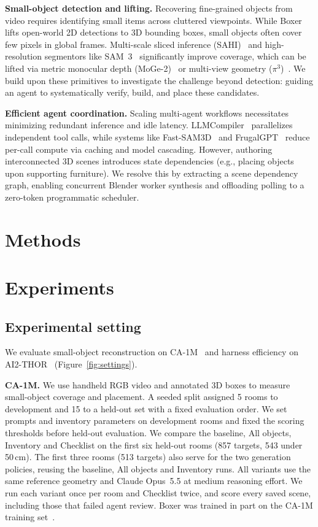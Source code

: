 \documentclass{article}
\begin{document}
\textbf{Small-object detection and lifting.}
Recovering fine-grained objects from video requires identifying small items across cluttered viewpoints. While Boxer~\cite{boxer} lifts open-world 2D detections to 3D bounding boxes, small objects often cover few pixels in global frames. Multi-scale sliced inference (SAHI)~\cite{sahi} and high-resolution segmentors like SAM~3~\cite{sam3} significantly improve coverage, which can be lifted via metric monocular depth (MoGe-2)~\cite{moge2} or multi-view geometry ($\pi^3$)~\cite{pi3}. We build upon these primitives to investigate the challenge beyond detection: guiding an agent to systematically verify, build, and place these candidates.

\textbf{Efficient agent coordination.}
Scaling multi-agent workflows necessitates minimizing redundant inference and idle latency. LLMCompiler~\cite{llmcompiler} parallelizes independent tool calls, while systems like Fast-SAM3D~\cite{fastsam3d} and FrugalGPT~\cite{frugalgpt} reduce per-call compute via caching and model cascading. However, authoring interconnected 3D scenes introduces state dependencies (e.g., placing objects upon supporting furniture). We resolve this by extracting a scene dependency graph, enabling concurrent Blender worker synthesis and offloading polling to a zero-token programmatic scheduler.

\section{Methods}



\section{Experiments}
\subsection{Experimental setting}
We evaluate small-object reconstruction on CA-1M~\cite{ca1m} and harness
efficiency on AI2-THOR~\cite{ai2thor} (Figure~\ref{fig:settings}).

\textbf{CA-1M.} We use handheld RGB video and annotated 3D boxes to measure
small-object coverage and placement. A seeded split assigned 5 rooms to
development and 15 to a held-out set with a fixed evaluation order. We set
prompts and inventory parameters on development rooms and fixed the scoring
thresholds before held-out evaluation. We compare the baseline, All objects,
Inventory and Checklist on the first six held-out rooms (857 targets,
543 under 50\,cm). The first three rooms (513 targets) also serve for the
two generation policies, reusing the baseline, All objects and Inventory
runs. All variants use the same reference geometry and Claude Opus~5.5 at
medium reasoning effort. We run each variant once per room and Checklist
twice, and score every saved scene, including those that failed agent review.
Boxer was trained in part on the CA-1M training set~\cite{boxer}.
\end{document}
